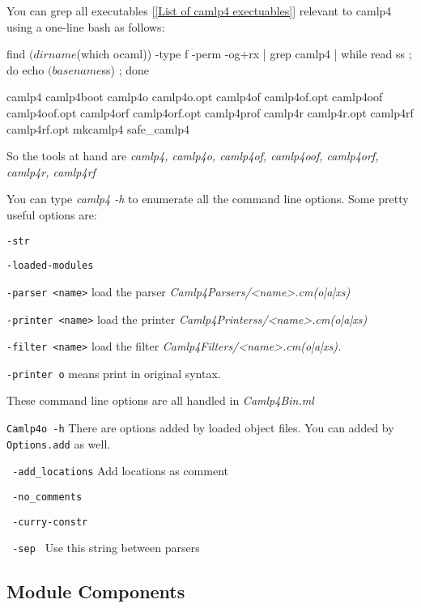 You can grep all executables [\ref{List of camlp4 exectuables}]
relevant to camlp4 using a one-line bash as follows:
\begin{bashcode}
find $(dirname $(which ocaml)) -type f -perm -og+rx | grep camlp4 |
while read ss ; do echo $(basename $ss) ; done
\end{bashcode}

\begin{bluetext}  
camlp4 camlp4boot camlp4o camlp4o.opt camlp4of camlp4of.opt camlp4oof
camlp4oof.opt camlp4orf camlp4orf.opt camlp4prof camlp4r camlp4r.opt
camlp4rf camlp4rf.opt mkcamlp4 safe_camlp4
\end{bluetext}

So the tools at hand are \textit{camlp4, camlp4o, camlp4of, camlp4oof,
  camlp4orf, camlp4r, camlp4rf }

You can type \textit{camlp4 -h } to enumerate all the command line
options. Some pretty useful options are: 

\verb|-str|

\verb|-loaded-modules|

\verb|-parser <name>| load the parser \textit{Camlp4Parsers/<name>.cm(o|a|xs)}


\verb|-printer <name>| load the printer
\textit{Camlp4Printerss/<name>.cm(o|a|xs)}

\verb|-filter <name>| load the filter 
\textit{Camlp4Filters/<name>.cm(o|a|xs).}


\verb|-printer o| means print in original syntax. 


These command line options are all handled in \emph{Camlp4Bin.ml}

\verb|Camlp4o -h| There are options added by loaded object files. You
can added by \verb|Options.add| as well.


\verb| -add_locations| Add locations as comment


\verb| -no_comments|


\verb| -curry-constr |


\verb| -sep | Use this string between parsers 




\subsection{Module Components}

